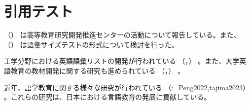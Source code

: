 \documentclass[a4paper,11pt,uplatex]{jsarticle}
\makeatletter
\newcommand{\jcite}[1]{%
  \citeauthor{#1}（\citeyear{#1}）%
}
\newcommand{\jpcite}[1]{%
  （\citeauthor{#1}，\citeyear{#1}）%
}
\newcommand{\jpcites}[1]{%
  （\def\i{1}\@for\@citeb:=#1\do{%
    \ifnum\i=1\else；\fi%
    \edef\i{0}%
    \citeauthor{\@citeb}，\citeyear{\@citeb}%
  }）%
}
\makeatother
\begin{document}
\section{引用テスト}

\jcite{kato2008}は高等教育研究開発推進センターの活動について報告している。また、\jcite{Sasao2008}は語彙サイズテストの形式について検討を行った。

工学分野における英語語彙リストの開発が行われている\jpcite{sasao2015}。また、大学英語教育の教材開発に関する研究も進められている\jpcite{omon2014}。

近年、語学教育に関する様々な研究が行われている\jpcites{Peng2022,tajima2023}。これらの研究は、日本における言語教育の発展に貢献している。




\printbibheading[title=参考文献]

\newrefcontext[labelprefix=J]
\printbibliography[heading=none,check=japanese]

\newrefcontext[labelprefix=F]
\printbibliography[heading=none,check=notjapanese,resetnumbers=false]
\end{document}
